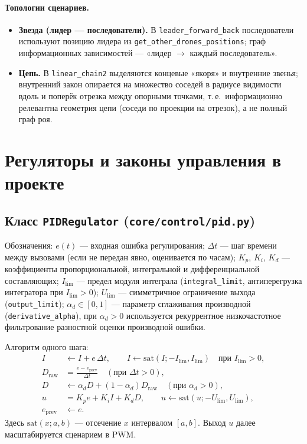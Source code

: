 \documentclass[12pt,a4paper]{article}
\begin{document}
\paragraph{Топологии сценариев.}
\begin{itemize}
  \item \textbf{Звезда (лидер --- последователи).} В \texttt{leader\_forward\_back} последователи используют позицию лидера из \texttt{get\_other\_drones\_positions}; граф информационных зависимостей --- «лидер $\to$ каждый последователь».
  \item \textbf{Цепь.} В \texttt{linear\_chain2} выделяются концевые «якоря» и внутренние звенья; внутренний закон опирается на множество соседей в радиусе видимости вдоль и поперёк отрезка между опорными точками, т.\,е.\ информационно релевантна геометрия цепи (соседи по проекции на отрезок), а не полный граф роя.
\end{itemize}

\section{Регуляторы и законы управления в проекте}

\subsection{Класс \texttt{PIDRegulator} (\texttt{core/control/pid.py})}

Обозначения: $e(t)$ --- входная ошибка регулирования; $\Delta t$ --- шаг времени между вызовами (если не передан явно, оценивается по часам); $K_p$, $K_i$, $K_d$ --- коэффициенты пропорциональной, интегральной и дифференциальной составляющих; $I_{\mathrm{lim}}$ --- предел модуля интеграла (\texttt{integral\_limit}, антиперегрузка интегратора при $I_{\mathrm{lim}}>0$); $U_{\mathrm{lim}}$ --- симметричное ограничение выхода (\texttt{output\_limit}); $\alpha_d \in [0,1]$ --- параметр сглаживания производной (\texttt{derivative\_alpha}), при $\alpha_d>0$ используется рекуррентное низкочастотное фильтрование разностной оценки производной ошибки.

Алгоритм одного шага:
\begin{align}
  I &\leftarrow I + e\,\Delta t, \qquad
  I \leftarrow \mathrm{sat}(I; -I_{\mathrm{lim}}, I_{\mathrm{lim}}) \quad \text{при } I_{\mathrm{lim}}>0, \\
  D_{\mathrm{raw}} &= \frac{e - e_{\mathrm{prev}}}{\Delta t} \quad (\text{при }\Delta t>0), \\
  D &\leftarrow \alpha_d D + (1-\alpha_d) D_{\mathrm{raw}} \quad (\text{при }\alpha_d>0), \\
  u &= K_p e + K_i I + K_d D, \qquad
  u \leftarrow \mathrm{sat}(u; -U_{\mathrm{lim}}, U_{\mathrm{lim}}), \\
  e_{\mathrm{prev}} &\leftarrow e.
\end{align}
Здесь $\mathrm{sat}(x; a, b)$ --- отсечение $x$ интервалом $[a,b]$. Выход $u$ далее масштабируется сценарием в PWM.
\end{document}
